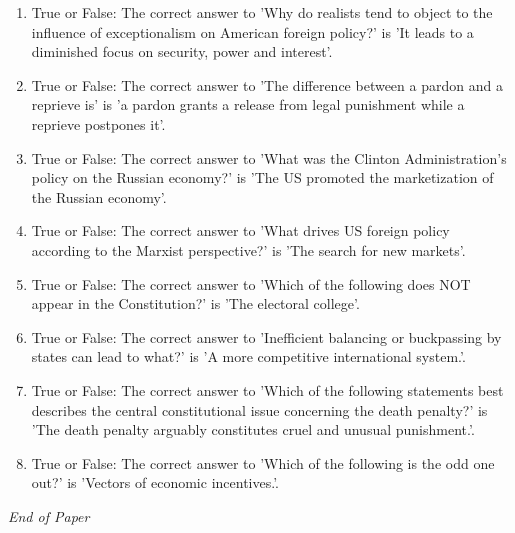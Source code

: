 \documentclass[12pt]{article}
\begin{document}
\begin{enumerate}[label=\arabic*.]
\item True or False: The correct answer to 'Why do realists tend to object to the influence of exceptionalism on American foreign policy?' is 'It leads to a diminished focus on security, power and interest'.
\item True or False: The correct answer to 'The difference between a pardon and a reprieve is' is 'a pardon grants a release from legal punishment while a reprieve postpones it'.
\item True or False: The correct answer to 'What was the Clinton Administration's policy on the Russian economy?' is 'The US promoted the marketization of the Russian economy'.
\item True or False: The correct answer to 'What drives US foreign policy according to the Marxist perspective?' is 'The search for new markets'.
\item True or False: The correct answer to 'Which of the following does NOT appear in the Constitution?' is 'The electoral college'.
\item True or False: The correct answer to 'Inefficient balancing or buckpassing by states can lead to what?' is 'A more competitive international system.'.
\item True or False: The correct answer to 'Which of the following statements best describes the central constitutional issue concerning the death penalty?' is 'The death penalty arguably constitutes cruel and unusual punishment.'.
\item True or False: The correct answer to 'Which of the following is the odd one out?' is 'Vectors of economic incentives.'.
\end{enumerate}

\vfill
\noindent\textit{End of Paper}
\end{document}
